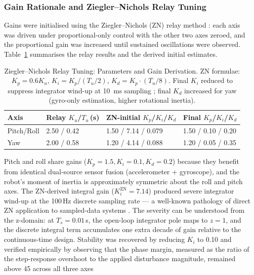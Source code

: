 \documentclass[journal]{IEEEtran}
\begin{document}
\subsubsection{Gain Rationale and Ziegler--Nichols Relay Tuning}
\label{subsubsec:zn}
Gains were initialised using the Ziegler--Nichols (ZN) relay
method \cite{astrom1984automatic}: each axis was driven under
proportional-only control with the other two axes zeroed,
and the proportional gain was increased until sustained
oscillations were observed.
Table~\ref{tab:zn} summarises the relay results and the
derived initial estimates.
\begin{table}[!t]
\caption{Ziegler--Nichols Relay Tuning: Parameters and Gain Derivation.
  ZN formulae: $K_p{=}0.6K_u$, $K_i{=}K_p/(T_u/2)$,
  $K_d{=}K_p{\cdot}(T_u/8)$. Final $K_i$ reduced to suppress
  integrator wind-up at \SI{10}{\milli\second} sampling
  \cite{astrom1984automatic}; final $K_d$ increased for yaw
  (gyro-only estimation, higher rotational inertia).}
\label{tab:zn}
\centering
\setlength{\tabcolsep}{3pt}
\footnotesize
\begin{tabular}{lp{1.5cm}p{2cm}p{2cm}}
\toprule
\textbf{Axis}
  & \textbf{Relay} $K_u$/$T_u$\,(s)
  & \textbf{ZN-initial} $K_p$/$K_i$/$K_d$
  & \textbf{Final} $K_p$/$K_i$/$K_d$ \\
\midrule
Pitch/Roll & 2.50 / 0.42 & 1.50 / 7.14 / 0.079 & 1.50 / 0.10 / 0.20 \\[2pt]
Yaw        & 2.00 / 0.58 & 1.20 / 4.14 / 0.088 & 1.20 / 0.05 / 0.35 \\
\bottomrule
\end{tabular}
\end{table}
Pitch and roll share gains ($K_p=1.5, K_i=0.1, K_d=0.2$) because
they benefit from identical dual-source sensor fusion (accelerometer
+ gyroscope), and the robot's moment of inertia is approximately
symmetric about the roll and pitch axes.
The ZN-derived integral gain ($K_i^\text{ZN} = 7.14$) produced
severe integrator wind-up at the 100\,Hz discrete sampling rate ---
a well-known pathology of direct ZN application to sampled-data
systems \cite{astrom1984automatic}.
The severity can be understood from the z-domain: at $T_s = 0.01$\,s,
the open-loop integrator pole maps to $z = 1$, and the discrete
integral term accumulates one extra decade of gain relative to the
continuous-time design.
Stability was recovered by reducing $K_i$ to 0.10 and verified
empirically by observing that the phase margin, measured as the
ratio of the step-response overshoot to the applied disturbance
magnitude, remained above 45\textdegree{} across all three axes
\end{document}
